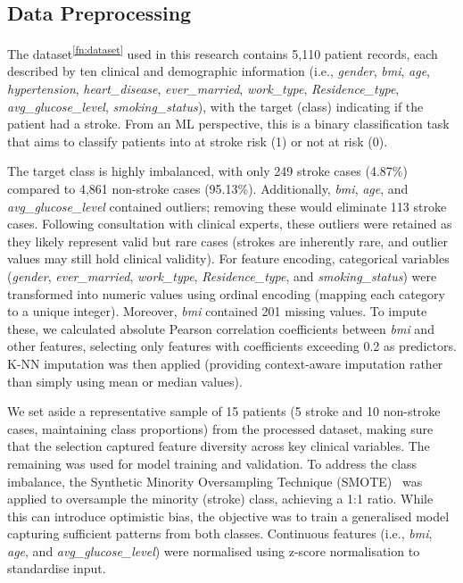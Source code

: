 \subsection{Data Preprocessing}
The dataset\textsuperscript{\ref{fn:dataset}} used in this research contains 5,110 patient records, each described by ten clinical and demographic information (i.e., \textit{gender}, \textit{bmi}, \textit{age}, \textit{hypertension}, \textit{heart\_disease}, \textit{ever\_married}, \textit{work\_type}, \textit{Residence\_type}, \textit{avg\_glucose\_level},  \textit{smoking\_status}), with the target (class) indicating if the patient had a stroke. From an ML perspective, this is a binary classification task that aims to classify patients into at stroke risk (1) or not at risk (0).

\medskip 
The target class is highly imbalanced, with only 249 stroke cases (4.87\%) compared to 4,861 non-stroke cases (95.13\%). Additionally, \textit{bmi}, \textit{age}, and \textit{avg\_glucose\_level} contained outliers; removing these would eliminate 113 stroke cases. Following consultation with clinical experts, these outliers were retained as they likely represent valid but rare cases (strokes are inherently rare, and outlier values may still hold clinical validity). For feature encoding, categorical variables (\textit{gender}, \textit{ever\_married}, \textit{work\_type}, \textit{Residence\_type}, and \textit{smoking\_status}) were transformed into numeric values using ordinal encoding (mapping each category to a unique integer). Moreover, \textit{bmi} contained 201 missing values. To impute these, we calculated absolute Pearson correlation coefficients between \textit{bmi} and other features, selecting only features with coefficients exceeding 0.2 as predictors. K-NN imputation was then applied (providing context-aware imputation rather than simply using mean or median values). 

\medskip
We set aside a representative sample of 15 patients (5 stroke and 10 non-stroke cases, maintaining class proportions) from the processed dataset, making sure that the selection captured feature diversity across key clinical variables. The remaining was used for model training and validation. To address the class imbalance, the Synthetic Minority Oversampling Technique (SMOTE)~\cite{chawla2002smote} was applied to oversample the minority (stroke) class, achieving a 1:1 ratio. While this can introduce optimistic bias, the objective was to train a generalised model capturing sufficient patterns from both classes. Continuous features (i.e., \textit{bmi}, \textit{age}, and \textit{avg\_glucose\_level}) were normalised using z-score normalisation to standardise input.

